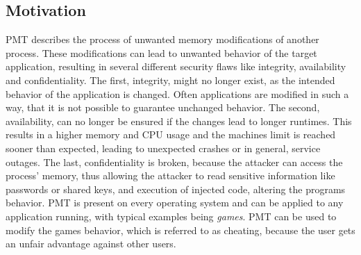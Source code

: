 \subsection{Motivation}
\gls{PMT} describes the process of unwanted memory modifications of another process. These modifications can lead to unwanted behavior of the target application, resulting in several different security flaws like integrity, availability and confidentiality. The first, integrity, might no longer exist, as the intended behavior of the application is changed. Often applications are modified in such a way, that it is not possible to guarantee unchanged behavior. The second, availability, can no longer be ensured if the changes lead to longer runtimes. This results in a higher memory and CPU usage and the machines limit is reached sooner than expected, leading to unexpected crashes or in general, service outages. The last, confidentiality is broken, because the attacker can access the process' memory, thus allowing the attacker to read sensitive information like passwords or shared keys, and execution of injected code, altering the programs behavior. \gls{PMT} is present on every operating system and can be applied to any application running, with typical examples being \emph{games}. \gls{PMT} can be used to modify the games behavior, which is referred to as cheating, because the user gets an unfair advantage against other users.